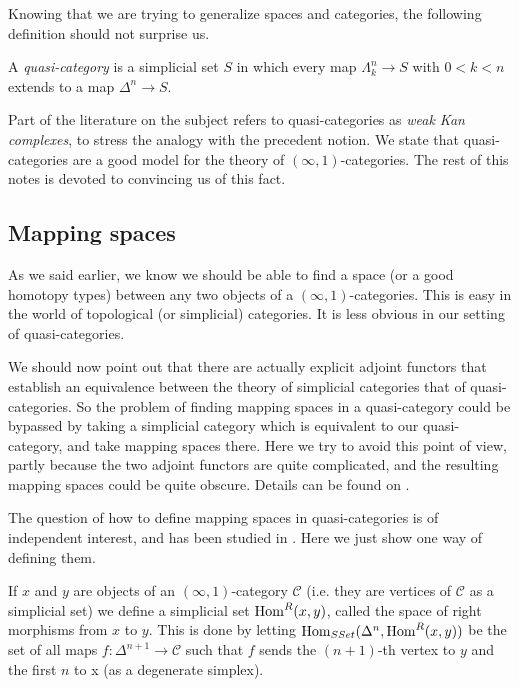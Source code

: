 \begin{refsection}
Knowing that we are trying to generalize spaces and categories, the following definition should not surprise us.

\begin{defin}
A \emph{quasi-category} is a simplicial set $S$ in which every map $\Lambda_k^n \to S$ with $0<k<n$ extends to a map $\Delta^n \to S$.
\end{defin}

Part of the literature on the subject refers to quasi-categories as \emph{weak Kan complexes}, to stress the analogy with the precedent notion.
We state that quasi-categories are a good model for the theory of $(\infty,1)$-categories. The rest of this notes is devoted to convincing us of this fact.

\subsection{Mapping spaces}

As we said earlier, we know we should be able to find a space (or a good homotopy types) between any two objects of a $(\infty,1)$-categories. This is easy in the world of topological (or simplicial) categories. It is less obvious in our setting of quasi-categories.

We should now point out that there are actually explicit adjoint functors that establish an equivalence between the theory of simplicial categories that of quasi-categories. So the problem of finding mapping spaces in a quasi-category could be bypassed by taking a simplicial category which is equivalent to our quasi-category, and take mapping spaces there. Here we try to avoid this point of view, partly because the two adjoint functors are quite complicated, and the resulting mapping spaces could be quite obscure. Details can be found on \cite{htt}.

The question of how to define mapping spaces in quasi-categories is of independent interest, and has been studied in \cite{DS}. Here we just show one way of defining them.

If $x$ and $y$ are objects of an $(\infty,1)$-category $\mathcal C$ (i.e. they are vertices of $\mathcal C$ as a simplicial set) we define a simplicial set $\mathrm{Hom}^R(x,y)$, called the space of right morphisms from $x$ to $y$. This is done by letting $\mathrm{Hom}_{SSet}(\Delta^n,\mathrm{Hom}^R(x,y))$ be the set of all maps $f: \Delta^{n+1} \to \mathcal C$ such that $f$ sends the $(n+1)$-th vertex to $y$ and the first $n$ to x (as a degenerate simplex).


\end{refsection}
